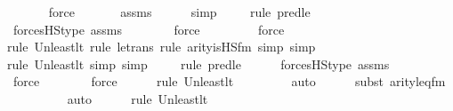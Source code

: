 \begin{isabellebody}
\ \ \ \ \ \isamarkupfalse%
\ force\ \isanewline
\ \ \ \ \isamarkupfalse%
\ assms\isanewline
\ \ \ \ \isamarkupfalse%
\ simp\isanewline
\ \ \ \ \isamarkupfalse%
{\isacharparenleft}{\kern0pt}rule\ pred{\isacharunderscore}{\kern0pt}le{\isacharparenright}{\kern0pt}\isanewline
\ \ \ \ \isamarkupfalse%
\ forcesHS{\isacharunderscore}{\kern0pt}type\ assms\isanewline
\ \ \ \ \ \ \isamarkupfalse%
\ force\ \isanewline
\ \ \ \ \ \ \isamarkupfalse%
\ force\ \isanewline
\ \ \ \ \ \isamarkupfalse%
{\isacharparenleft}{\kern0pt}rule\ Un{\isacharunderscore}{\kern0pt}least{\isacharunderscore}{\kern0pt}lt{\isacharcomma}{\kern0pt}\ rule\ le{\isacharunderscore}{\kern0pt}trans{\isacharcomma}{\kern0pt}\ rule\ arity{\isacharunderscore}{\kern0pt}is{\isacharunderscore}{\kern0pt}HS{\isacharunderscore}{\kern0pt}fm{\isacharcomma}{\kern0pt}\ simp{\isacharcomma}{\kern0pt}\ simp{\isacharparenright}{\kern0pt}\isanewline
\ \ \ \ \ \ \isamarkupfalse%
{\isacharparenleft}{\kern0pt}rule\ Un{\isacharunderscore}{\kern0pt}least{\isacharunderscore}{\kern0pt}lt{\isacharcomma}{\kern0pt}\ simp\ {\isacharcomma}{\kern0pt}simp{\isacharparenright}{\kern0pt}\isanewline
\ \ \ \ \isamarkupfalse%
{\isacharparenleft}{\kern0pt}rule\ pred{\isacharunderscore}{\kern0pt}le{\isacharparenright}{\kern0pt}\isanewline
\ \ \ \ \isamarkupfalse%
\ forcesHS{\isacharunderscore}{\kern0pt}type\ assms\isanewline
\ \ \ \ \ \ \isamarkupfalse%
\ force\ \isanewline
\ \ \ \ \ \isamarkupfalse%
\ force\ \isanewline
\ \ \ \ \isamarkupfalse%
{\isacharparenleft}{\kern0pt}rule\ Un{\isacharunderscore}{\kern0pt}least{\isacharunderscore}{\kern0pt}lt{\isacharparenright}{\kern0pt}{\isacharplus}{\kern0pt}\isanewline
\ \ \ \ \ \ \ \isamarkupfalse%
\ auto{\isacharbrackleft}{\kern0pt}{}{\isacharbrackright}{\kern0pt}\isanewline
\ \ \ \ \ \isamarkupfalse%
{\isacharparenleft}{\kern0pt}subst\ arity{\isacharunderscore}{\kern0pt}leq{\isacharunderscore}{\kern0pt}fm{\isacharparenright}{\kern0pt}\isanewline
\ \ \ \ \ \ \ \ \isamarkupfalse%
\ auto{\isacharbrackleft}{\kern0pt}{}{\isacharbrackright}{\kern0pt}\isanewline
\ \ \ \ \ \isamarkupfalse%
{\isacharparenleft}{\kern0pt}rule\ Un{\isacharunderscore}{\kern0pt}least{\isacharunderscore}{\kern0pt}lt{\isacharparenright}{\kern0pt}{\isacharplus}{\kern0pt}\isanewline
\ \ \ \ \ \ \ \isamarkupfalse%

\end{isabellebody}
